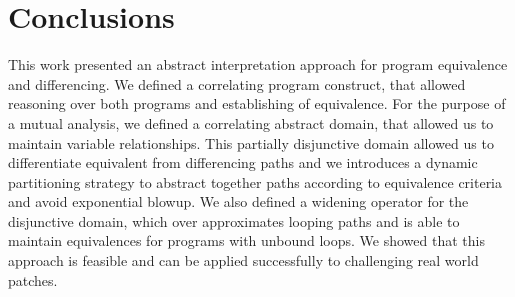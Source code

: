 \section{Conclusions} 

This work presented an abstract interpretation approach for program equivalence and differencing. We defined a correlating program construct, that allowed reasoning over both programs and establishing of equivalence. For the purpose of a mutual analysis, we defined a correlating abstract domain, that allowed us to maintain variable relationships. This partially disjunctive domain allowed us to differentiate equivalent from differencing paths and we introduces a dynamic partitioning strategy to abstract together paths according to equivalence criteria and avoid exponential blowup. We also defined a widening operator for the disjunctive domain, which over approximates looping paths and is able to maintain equivalences for programs with unbound loops. We showed that this approach is feasible and can be applied successfully to challenging real world patches. 